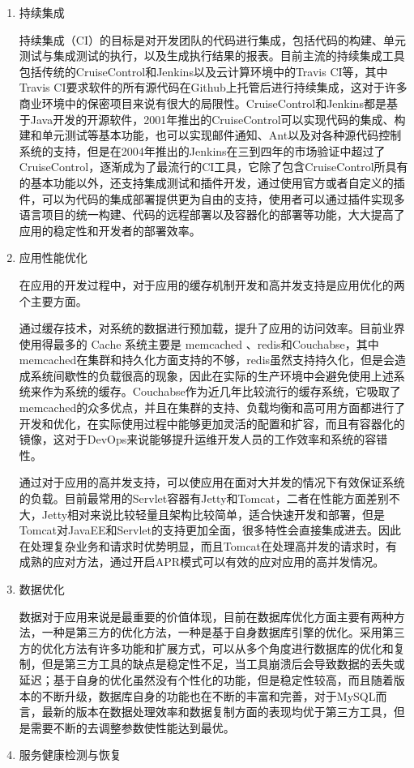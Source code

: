 \begin{enumerate}
  \item 持续集成

  持续集成（CI）的目标是对开发团队的代码进行集成，包括代码的构建、单元测试与集成测试的执行，以及生成执行结果的报表。目前主流的持续集成工具包括传统的CruiseControl和Jenkins以及云计算环境中的Travis CI等，其中Travis CI要求软件的所有源代码在Github上托管后进行持续集成，这对于许多商业环境中的保密项目来说有很大的局限性。CruiseControl和Jenkins都是基于Java开发的开源软件，2001年推出的CruiseControl可以实现代码的集成、构建和单元测试等基本功能，也可以实现邮件通知、Ant以及对各种源代码控制系统的支持，但是在2004年推出的Jenkins在三到四年的市场验证中超过了CruiseControl，逐渐成为了最流行的CI工具，它除了包含CruiseControl所具有的基本功能以外，还支持集成测试和插件开发，通过使用官方或者自定义的插件，可以为代码的集成部署提供更为自由的支持，使用者可以通过插件实现多语言项目的统一构建、代码的远程部署以及容器化的部署等功能，大大提高了应用的稳定性和开发者的部署效率。
  \item 应用性能优化

  在应用的开发过程中，对于应用的缓存机制开发和高并发支持是应用优化的两个主要方面。

  通过缓存技术，对系统的数据进行预加载，提升了应用的访问效率。目前业界使用得最多的 Cache 系统主要是 memcached 、redis和Couchabse，其中memcached在集群和持久化方面支持的不够，redis虽然支持持久化，但是会造成系统间歇性的负载很高的现象，因此在实际的生产环境中会避免使用上述系统来作为系统的缓存。Couchabse作为近几年比较流行的缓存系统，它吸取了memcached的众多优点，并且在集群的支持、负载均衡和高可用方面都进行了开发和优化，在实际使用过程中能够更加灵活的配置和扩容，而且有容器化的镜像，这对于DevOps来说能够提升运维开发人员的工作效率和系统的容错性。

  通过对于应用的高并发支持，可以使应用在面对大并发的情况下有效保证系统的负载。目前最常用的Servlet容器有Jetty和Tomcat，二者在性能方面差别不大，Jetty相对来说比较轻量且架构比较简单，适合快速开发和部署，但是Tomcat对JavaEE和Servlet的支持更加全面，很多特性会直接集成进去。因此在处理复杂业务和请求时优势明显，而且Tomcat在处理高并发的请求时，有成熟的应对方法，通过开启APR模式可以有效的应对应用的高并发情况。
  \item 数据优化

  数据对于应用来说是最重要的价值体现，目前在数据库优化方面主要有两种方法，一种是第三方的优化方法，一种是基于自身数据库引擎的优化。采用第三方的优化方法有许多功能和扩展方式，可以从多个角度进行数据库的优化和复制，但是第三方工具的缺点是稳定性不足，当工具崩溃后会导致数据的丢失或延迟；基于自身的优化虽然没有个性化的功能，但是稳定性较高，而且随着版本的不断升级，数据库自身的功能也在不断的丰富和完善，对于MySQL而言，最新的版本在数据处理效率和数据复制方面的表现均优于第三方工具，但是需要不断的去调整参数使性能达到最优。
  \item 服务健康检测与恢复


\end{enumerate}
